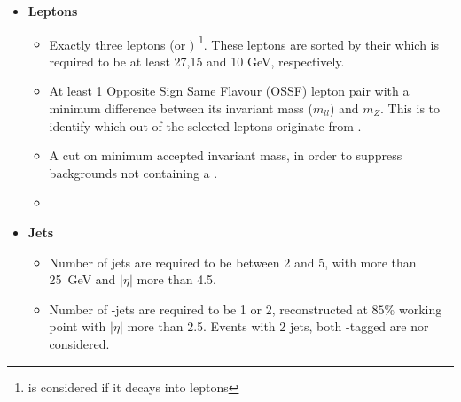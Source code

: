 \begin{itemize}
  \item \textbf{Leptons}
    \begin{itemize}
      \item Exactly three leptons (\Pelectron or \Pmu)
      \footnote{\Ptau is considered if it decays into leptons}. These leptons are 
      sorted by their \pT which is required to be at least 27,15 and 10 GeV, respectively.
      
      \item At least 1 Opposite Sign Same Flavour (OSSF) lepton pair with a minimum
      difference between its invariant mass ($m_{ll}$) and $m_Z$. This is to identify 
      which out of the selected leptons originate from \PZ.

      \item A cut on minimum accepted invariant mass, in order to suppress backgrounds 
      not containing a \PZ.

      \item {}
  \end{itemize}
  \item \textbf{Jets}
  \begin{itemize}
    \item Number of jets are required to be between 2 and 5, with \pT more than \qty{25}{GeV}
    and $|\eta|$ more than 4.5.
    \item Number of \Pbottom-jets are required to be 1 or 2, reconstructed at $85\%$ working 
    point with $|\eta|$ more than 2.5. Events with 2 jets, both \Pbottom-tagged are nor considered.
  \end{itemize}


\end{itemize}


